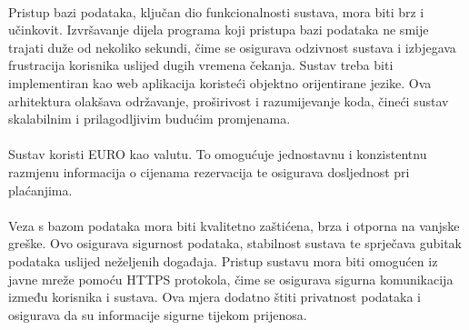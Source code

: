 \paragraph*{}{Pristup bazi podataka, ključan dio funkcionalnosti sustava, mora biti brz i učinkovit. Izvršavanje dijela programa koji pristupa bazi podataka ne smije trajati duže od nekoliko sekundi, čime se osigurava odzivnost sustava i izbjegava frustracija korisnika uslijed dugih vremena čekanja. Sustav treba biti implementiran kao web aplikacija koristeći objektno orijentirane jezike. Ova arhitektura olakšava održavanje, proširivost i razumijevanje koda, čineći sustav skalabilnim i prilagodljivim budućim promjenama.}
\paragraph*{}{Sustav koristi EURO kao valutu. To omogućuje jednostavnu i konzistentnu razmjenu informacija o cijenama rezervacija te osigurava dosljednost pri plaćanjima.}
\paragraph*{}{Veza s bazom podataka mora biti kvalitetno zaštićena, brza i otporna na vanjske greške. Ovo osigurava sigurnost podataka, stabilnost sustava te sprječava gubitak podataka uslijed neželjenih događaja. Pristup sustavu mora biti omogućen iz javne mreže pomoću HTTPS protokola, čime se osigurava sigurna komunikacija između korisnika i sustava. Ova mjera dodatno štiti privatnost podataka i osigurava da su informacije sigurne tijekom prijenosa.}

\eject

